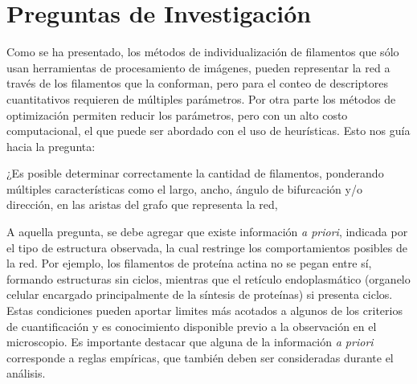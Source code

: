 \documentclass{article}
\begin{document}
\section{Preguntas de Investigaci\'on}

Como se ha presentado, los m\'etodos de individualizaci\'on de filamentos que s\'olo usan herramientas de procesamiento de im\'agenes, pueden representar la red a trav\'es de los filamentos que la conforman, pero para el conteo de descriptores cuantitativos requieren de m\'ultiples par\'ametros. Por otra parte los m\'etodos de optimizaci\'on permiten reducir los par\'ametros, pero con un alto costo computacional, el que puede ser abordado con el uso de heur\'isticas. Esto nos gu\'ia hacia la pregunta:

\smallskip


¿Es posible determinar correctamente la cantidad de filamentos, ponderando m\'ultiples caracter\'isticas como el largo, ancho, \'angulo de bifurcaci\'on y/o direcci\'on, en las aristas del grafo que representa la red,  



A aquella pregunta, se debe agregar que existe informaci\'on \textit{a priori}, indicada por el tipo de estructura observada, la cual restringe los comportamientos posibles de la red. Por ejemplo, los filamentos de prote\'ina actina no se pegan entre s\'i, formando estructuras sin ciclos, mientras que el ret\'iculo endoplasm\'atico (organelo celular encargado principalmente de la s\'intesis de prote\'inas) si presenta ciclos. Estas condiciones pueden aportar limites m\'as acotados a algunos de los criterios de cuantificaci\'on y es conocimiento disponible previo a la observaci\'on en el microscopio.
Es importante destacar que alguna de la informaci\'on {\it a priori} corresponde a reglas emp\'iricas, que tambi\'en deben ser consideradas durante el an\'alisis.
\end{document}
